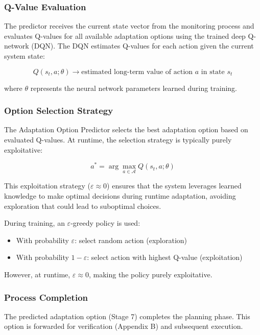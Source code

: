 \documentclass[11pt,a4paper]{article}
\begin{document}
\subsubsection{Q-Value Evaluation}

The predictor receives the current state vector from the monitoring process and evaluates Q-values for all available adaptation options using the trained deep Q-network (DQN). The DQN estimates Q-values for each action given the current system state:

\[
Q(s_t, a; \theta) \rightarrow \text{estimated long-term value of action } a \text{ in state } s_t
\]

where $\theta$ represents the neural network parameters learned during training.

\subsubsection{Option Selection Strategy}

The Adaptation Option Predictor selects the best adaptation option based on evaluated Q-values. At runtime, the selection strategy is typically purely exploitative:

\[
a^* = \arg\max_{a \in \mathcal{A}} Q(s_t, a; \theta)
\]

This exploitation strategy ($\varepsilon \approx 0$) ensures that the system leverages learned knowledge to make optimal decisions during runtime adaptation, avoiding exploration that could lead to suboptimal choices.

During training, an $\varepsilon$-greedy policy is used:
\begin{itemize}
    \item With probability $\varepsilon$: select random action (exploration)
    \item With probability $1-\varepsilon$: select action with highest Q-value (exploitation)
\end{itemize}

However, at runtime, $\varepsilon \approx 0$, making the policy purely exploitative.

\subsubsection{Process Completion}

The predicted adaptation option (Stage 7) completes the planning phase. This option is forwarded for verification (Appendix B) and subsequent execution.
\end{document}
